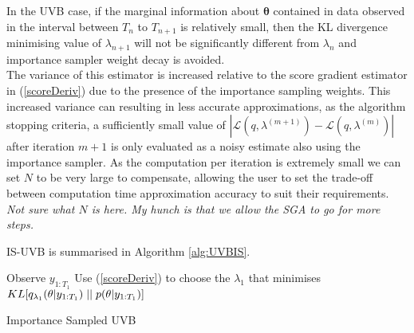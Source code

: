 \documentclass[12pt,a4paper]{article}\usepackage[]{graphicx}\usepackage[]{color}
\begin{document}
{In the UVB case, if the marginal information about ${\bm\theta}$ contained in data observed in the interval between $T_n$ to $T_{n+1}$ is relatively small, then the KL divergence minimising value of $\lambda_{n+1}$ will not be significantly different from $\lambda_n$ and importance sampler weight decay is avoided.
\\

The variance of this estimator is increased relative to the score gradient estimator in (\ref{scoreDeriv}) due to the presence of the importance sampling weights. This increased variance can resulting in less accurate approximations, as the algorithm stopping criteria, a sufficiently small value of $|\mathcal{L}(q, \lambda^{(m+1)}) - \mathcal{L}(q, \lambda^{(m)})|$ after iteration $m+1$ is only evaluated as a noisy estimate also using the importance sampler. As the computation per iteration is extremely small we can set $N$ to be very large to compensate, allowing the user to set the trade-off between computation time approximation accuracy to suit their requirements.
\\
{\em Not sure what $N$ is here.  My hunch is that we allow the SGA to go for more steps.}

IS-UVB is summarised in Algorithm \ref{alg:UVBIS}.
\\

\vspace{2mm}
\begin{algorithm}[H]
	Observe $y_{1:T_1}$\;
	Use (\ref{scoreDeriv}) to choose the $\lambda_1$ that minimises $KL[q_{\lambda_1}(\theta |y_{1:T_1})\hspace{.1cm}||\hspace{.1cm}p(\theta |y_{1:T_1})]$\;
	\caption{Importance Sampled UVB}
	\label{alg:UVBIS}
\end{algorithm}
}
\end{document}
